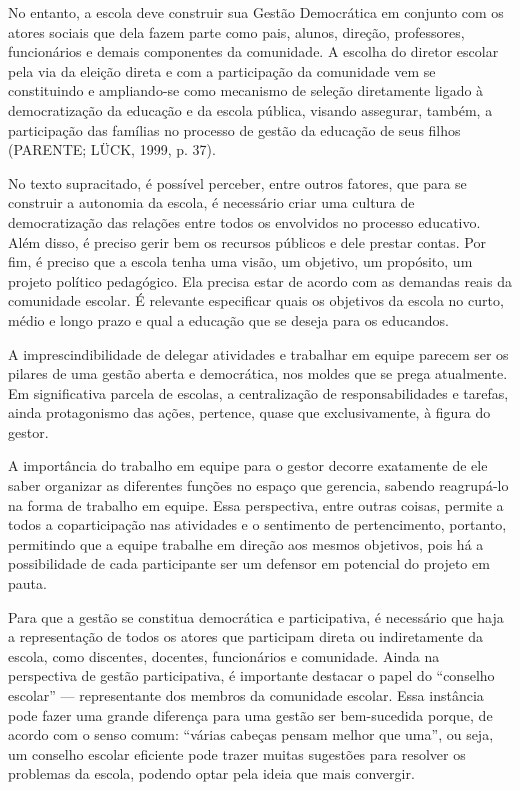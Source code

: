 \begin{refsection}
    No entanto, a escola deve construir sua Gestão Democrática em conjunto com os atores sociais que dela fazem parte como pais, alunos, direção, professores, funcionários e demais componentes da comunidade. A escolha do diretor escolar pela via da eleição direta e com a participação da comunidade vem se constituindo e ampliando-se como mecanismo de seleção diretamente ligado à democratização da educação e da escola pública, visando assegurar, também, a participação das famílias no processo de gestão da educação de seus filhos (PARENTE; LÜCK, 1999, p. 37).  

    No texto supracitado, é possível perceber, entre outros fatores, que para se construir a autonomia da escola, é necessário criar uma cultura de democratização das relações entre todos os envolvidos no processo educativo. Além disso, é preciso gerir bem os recursos públicos e dele prestar contas. Por fim, é preciso que a escola tenha uma visão, um objetivo, um propósito, um projeto político pedagógico. Ela precisa estar de acordo com as demandas reais da comunidade escolar. É relevante especificar quais os objetivos da escola no curto, médio e longo prazo e qual a educação que se deseja para os educandos. 

    A imprescindibilidade de delegar atividades e trabalhar em equipe parecem ser os pilares de uma gestão aberta e democrática, nos moldes que se prega atualmente. Em significativa parcela de escolas, a centralização de responsabilidades e tarefas, ainda protagonismo das ações, pertence, quase que exclusivamente, à figura do gestor.  

    A importância do trabalho em equipe para o gestor decorre exatamente de ele saber organizar as diferentes funções no espaço que gerencia, sabendo reagrupá-lo na forma de trabalho em equipe. Essa perspectiva, entre outras coisas, permite a todos a coparticipação nas atividades e o sentimento de pertencimento, portanto, permitindo que a equipe trabalhe em direção aos mesmos objetivos, pois há a possibilidade de cada participante ser um defensor em potencial do projeto em pauta. 

    Para que a gestão se constitua democrática e participativa, é necessário que haja a representação de todos os atores que participam direta ou indiretamente da escola, como discentes, docentes, funcionários e comunidade. Ainda na perspectiva de gestão participativa, é importante destacar o papel do “conselho escolar” --- representante dos membros da comunidade escolar. Essa instância pode fazer uma grande diferença para uma gestão ser bem-sucedida porque, de acordo com o senso comum: “várias cabeças pensam melhor que uma”, ou seja, um conselho escolar eficiente pode trazer muitas sugestões para resolver os problemas da escola, podendo optar pela ideia que mais convergir.



\end{refsection}
